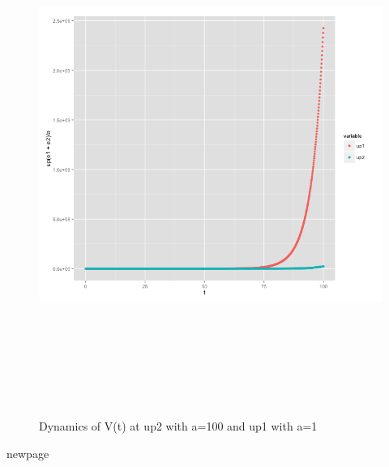 \documentclass[12pt]{article}
\numberwithin{equation}{subsection} %
\begin{document}
\begin{figure}[ht!]
\centering
\includegraphics[width=170mm,height=170mm]{final2.png}
\caption{Dynamics of V(t) at  up2 with a=100 and up1 with a=1\label{overflow}}
\end{figure}
newpage
\end{document}
